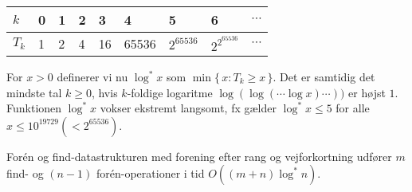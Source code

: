 \medskip
\begin{tabular}{l|lllllllc}
  $k$  & 0 & 1 & 2 & 3 & 4 & 5 & 6 & $\cdots$ \\\midrule
  $T_k$ & 1 & 2 & 4 & 16 & 65536 & $2^{65536}$ & $2^{2^{65536}}$ & $\cdots$
\end{tabular}
\medskip

For $x>0$ definerer vi nu $\log^* x$ som $\min\{\,x\colon T_k\geq x\,\}$.
Det er samtidig det mindste tal $k\geq 0$, hvis $k$-foldige logaritme  $\log (\log (\cdots\log x)\cdots))$ er højst $1$.
Funktionen $\log ^* x$ vokser ekstremt langsomt, fx gælder $\log^*x\leq 5$ for alle $x\leq 10^{19729}(<2^{65536})$.

\begin{thm}
  Forén og find-datastrukturen med forening efter rang og vejforkortning udfører $m$ find- og $(n-1)$ forén-operationer i tid $O((m+n)\log^* n)$.
\end{thm}

